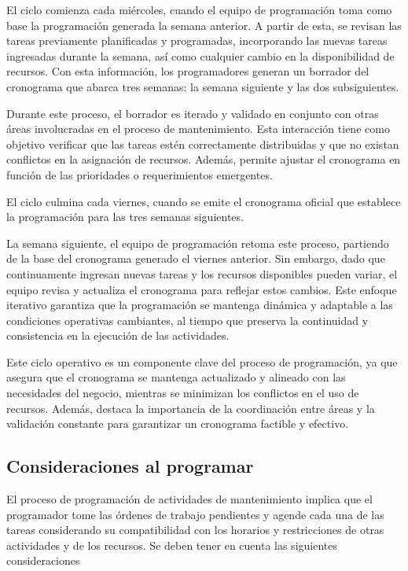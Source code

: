 \documentclass{article}
\begin{document}
El ciclo comienza cada miércoles, cuando el equipo de programación toma como base la programación generada la semana anterior. A partir de esta, se revisan las tareas previamente planificadas y programadas, incorporando las nuevas tareas ingresadas durante la semana, así como cualquier cambio en la disponibilidad de recursos. Con esta información, los programadores generan un borrador del cronograma que abarca tres semanas: la semana siguiente y las dos subsiguientes.

Durante este proceso, el borrador es iterado y validado en conjunto con otras áreas involucradas en el proceso de mantenimiento. Esta interacción tiene como objetivo verificar que las tareas estén correctamente distribuidas y que no existan conflictos en la asignación de recursos. Además, permite ajustar el cronograma en función de las prioridades o requerimientos emergentes.

El ciclo culmina cada viernes, cuando se emite el cronograma oficial que establece la programación para las tres semanas siguientes.

La semana siguiente, el equipo de programación retoma este proceso, partiendo de la base del cronograma generado el viernes anterior. Sin embargo, dado que continuamente ingresan nuevas tareas y los recursos disponibles pueden variar, el equipo revisa y actualiza el cronograma para reflejar estos cambios. Este enfoque iterativo garantiza que la programación se mantenga dinámica y adaptable a las condiciones operativas cambiantes, al tiempo que preserva la continuidad y consistencia en la ejecución de las actividades.

Este ciclo operativo es un componente clave del proceso de programación, ya que asegura que el cronograma se mantenga actualizado y alineado con las necesidades del negocio, mientras se minimizan los conflictos en el uso de recursos. Además, destaca la importancia de la coordinación entre áreas y la validación constante para garantizar un cronograma factible y efectivo.

\subsection{Consideraciones al programar}
El proceso de programación de actividades de mantenimiento implica que el programador tome las órdenes de trabajo pendientes y agende cada una de las tareas considerando su compatibilidad con los horarios y restricciones de otras actividades y de los recursos. Se deben tener en cuenta las siguientes consideraciones
\end{document}

